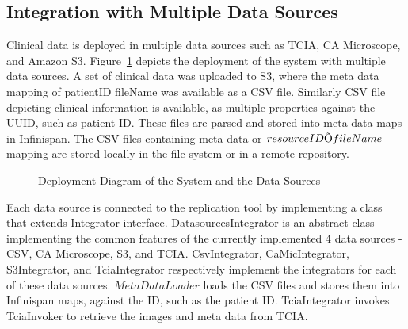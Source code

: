 \documentclass[conference]{IEEEtran}
\begin{document}
\subsection{Integration with Multiple Data Sources}
Clinical data is deployed in multiple data sources such as TCIA, CA Microscope, and Amazon S3. Figure~\ref{fig:dsdeployment} depicts the deployment of the system with multiple data sources. A set of clinical data was uploaded to S3, where the meta data mapping of patientID  fileName was available as a CSV file. Similarly CSV file depicting clinical information is available, as multiple properties against the UUID, such as patient ID. These files are parsed and stored into meta data maps in Infinispan. The CSV files containing meta data or $resource ID \ding{213} fileName$ mapping are stored locally in the file system or in a remote repository.
\begin{figure}[!htbp]
\begin{center}
\end{center}
 \caption{Deployment Diagram of the System and the Data Sources}
 \label{fig:dsdeployment}
\end{figure}

Each data source is connected to the replication tool by implementing a class that extends Integrator interface. DatasourcesIntegrator is an abstract class implementing the common features of the currently implemented 4 data sources - CSV, CA Microscope, S3, and TCIA. CsvIntegrator, CaMicIntegrator, S3Integrator, and TciaIntegrator respectively implement the integrators for each of these data sources. $MetaDataLoader$ loads the CSV files and stores them into Infinispan maps, against the ID, such as the patient ID. TciaIntegrator invokes TciaInvoker to retrieve the images and meta data from TCIA.
\end{document}

